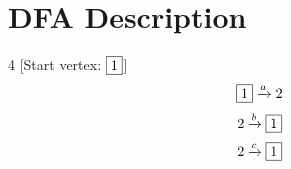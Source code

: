 \documentclass[12pt]{article}
\begin{document}
 
\section* {DFA Description} 
\begin {multicols}{4} 
[Start vertex: $\fbox{1}$]
\begin {equation*} 
\begin {gathered} 
\fbox{1} \xrightarrow{a} 2\end {gathered} 
\end {equation*} 
\begin {equation*} 
\begin {gathered} 
2 \xrightarrow{b} \fbox{1}\end {gathered} 
\end {equation*} 
\begin {equation*} 
\begin {gathered} 
2 \xrightarrow{c} \fbox{1}\end {gathered} 
\end {equation*} 

\end{multicols}
\end{document}
